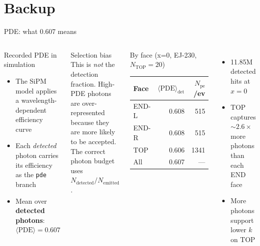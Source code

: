 \documentclass[aspectratio=169,9pt]{beamer}
\newcommand{\Ntop}{N_{\mathrm{TOP}}}
\newcommand{\Npe}{N_{\mathrm{pe}}}
\begin{document}
\appendix
\section*{Backup}

\begin{frame}{PDE: what 0.607 means}
\begin{columns}[c]
\begin{block}{Recorded PDE in simulation}
\begin{itemize}\setlength\itemsep{4pt}
  \item The SiPM model applies a wavelength-dependent efficiency curve
  \item Each \emph{detected} photon carries its efficiency as the \texttt{pde} branch
  \item Mean over \textbf{detected photons}: $\langle\mathrm{PDE}\rangle = 0.607$
\end{itemize}
\end{block}
\begin{alertblock}{Selection bias}
This is \emph{not} the detection fraction.
High-PDE photons are over-represented because
they are more likely to be accepted. The
correct photon budget uses
$N_{\mathrm{detected}} / N_{\mathrm{emitted}}$.
\end{alertblock}
\begin{block}{By face (x=0, EJ-230, $\Ntop=20$)}
\small
\begin{tabular}{lrr}
\toprule
Face & $\langle\mathrm{PDE}\rangle_{\mathrm{det}}$ & $\Npe$/ev \\
\midrule
END-L & 0.608 & 515 \\
END-R & 0.608 & 515 \\
TOP   & 0.606 & 1341 \\
\midrule
All   & 0.607 & — \\
\bottomrule
\end{tabular}
\end{block}
\begin{itemize}\setlength\itemsep{3pt}
  \item 11.85M detected hits at $x=0$
  \item TOP captures $\sim2.6\times$ more photons
    than each END face
  \item More photons support lower $k$ on TOP
\end{itemize}
\end{columns}
\end{frame}
\end{document}
